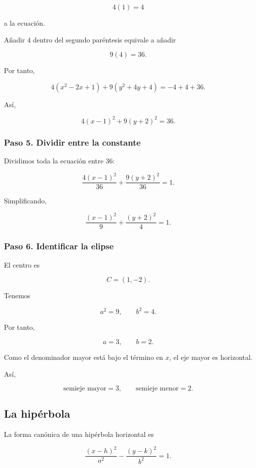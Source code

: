 \documentclass[12pt]{article}
\begin{document}
\[
4(1)=4
\]

a la ecuación.

Añadir \(4\) dentro del segundo paréntesis equivale a añadir

\[
9(4)=36.
\]

Por tanto,

\[
4(x^2-2x+1)+9(y^2+4y+4)
=
-4+4+36.
\]

Así,

\[
4(x-1)^2+9(y+2)^2=36.
\]

\subsubsection*{Paso 5. Dividir entre la constante}

Dividimos toda la ecuación entre \(36\):

\[
\frac{4(x-1)^2}{36}
+
\frac{9(y+2)^2}{36}
=
1.
\]

Simplificando,

\[
\boxed{
\frac{(x-1)^2}{9}
+
\frac{(y+2)^2}{4}
=
1.
}
\]

\subsubsection*{Paso 6. Identificar la elipse}

El centro es

\[
\boxed{
C=(1,-2).
}
\]

Tenemos

\[
a^2=9,
\qquad
b^2=4.
\]

Por tanto,

\[
a=3,
\qquad
b=2.
\]

Como el denominador mayor está bajo el término en \(x\), el eje mayor es
horizontal.

Así,

\[
\boxed{
\text{semieje mayor}=3,
\qquad
\text{semieje menor}=2.
}
\]

\subsection{La hipérbola}

La forma canónica de una hipérbola horizontal es

\[
\boxed{
\frac{(x-h)^2}{a^2}
-
\frac{(y-k)^2}{b^2}
=1.
}
\]
\end{document}

